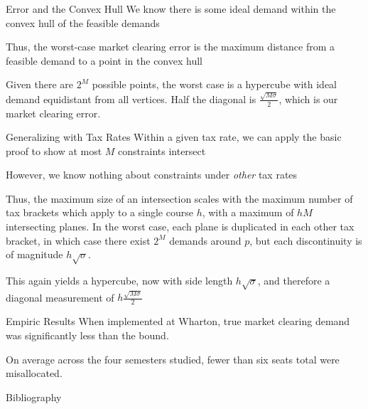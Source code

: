 \documentclass{beamer}
\begin{document}
\begin{frame}{Error and the Convex Hull}
We know there is some ideal demand within the convex hull of the feasible demands

Thus, the worst-case market clearing error is the maximum distance from a feasible demand to a point in the convex hull

Given there are $2^M$ possible points, the worst case is a hypercube with ideal demand equidistant from all vertices. Half the diagonal is $\frac{\sqrt{M\sigma}}{2}$, which is our market clearing error.
\end{frame}

\begin{frame}{Generalizing with Tax Rates}
Within a given tax rate, we can apply the basic proof to show at most $M$ constraints intersect
\pause 

However, we know nothing about constraints under \emph{other} tax rates
\pause 

Thus, the maximum size of an intersection scales with the maximum number of tax brackets which apply to a single course $h$, with a maximum of $hM$ intersecting planes. In the worst case, each plane is duplicated in each other tax bracket, in which case there exist $2^M$ demands around $p$, but each discontinuity is of magnitude $h\sqrt{\sigma}$.

This again yields a hypercube, now with side length $h\sqrt{\sigma}$, and therefore a diagonal measurement of $h\frac{\sqrt{M\sigma}}{2}$
\end{frame}
\begin{frame}{Empiric Results}
When implemented at Wharton, true market clearing demand was significantly less than the bound.

On average across the four semesters studied, fewer than six seats total were misallocated.
\end{frame}
\begin{frame}[allowframebreaks]{Bibliography}
\printbibliography
\end{frame}
\end{document}
